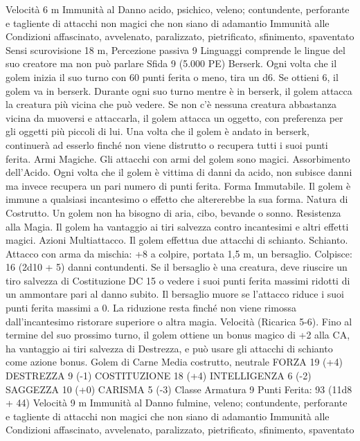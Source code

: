 \begin{multicols}{2}
Velocità 6 m
Immunità al Danno acido, psichico, veleno; contundente,
perforante e tagliente di attacchi non magici che non siano di
adamantio
Immunità alle Condizioni affascinato, avvelenato, paralizzato,
pietrificato, sfinimento, spaventato
Sensi scurovisione 18 m, Percezione passiva 9
Linguaggi comprende le lingue del suo creatore ma non può
parlare
Sfida 9 (5.000 PE)
Berserk. Ogni volta che il golem inizia il suo turno con 60 punti
ferita o meno, tira un d6. Se ottieni 6, il golem va in berserk.
Durante ogni suo turno mentre è in berserk, il golem attacca la
creatura più vicina che può vedere. Se non c’è nessuna creatura
abbastanza vicina da muoversi e attaccarla, il golem attacca un
oggetto, con preferenza per gli oggetti più piccoli di lui. Una
volta che il golem è andato in berserk, continuerà ad esserlo
finché non viene distrutto o recupera tutti i suoi punti ferita.
Armi Magiche. Gli attacchi con armi del golem sono magici.
Assorbimento dell’Acido. Ogni volta che il golem è vittima di
danni da acido, non subisce danni ma invece recupera un pari
numero di punti ferita.
Forma Immutabile. Il golem è immune a qualsiasi incantesimo o
effetto che altererebbe la sua forma.
Natura di Costrutto. Un golem non ha bisogno di aria, cibo,
bevande o sonno.
Resistenza alla Magia. Il golem ha vantaggio ai tiri salvezza
contro incantesimi e altri effetti magici.
Azioni
Multiattacco. Il golem effettua due attacchi di schianto.
Schianto. Attacco con arma da mischia: +8 a colpire, portata 1,5
m, un bersaglio.
Colpisce: 16 (2d10 + 5) danni contundenti. Se il bersaglio è una
creatura, deve riuscire un tiro salvezza di Costituzione DC 15 o
vedere i suoi punti ferita massimi ridotti di un ammontare pari al
danno subito. Il bersaglio muore se l’attacco riduce i suoi punti
ferita massimi a 0. La riduzione resta finché non viene rimossa
dall’incantesimo ristorare superiore o altra magia.
Velocità (Ricarica 5-6). Fino al termine del suo prossimo turno,
il golem ottiene un bonus magico di +2 alla CA, ha vantaggio ai
tiri salvezza di Destrezza, e può usare gli attacchi di schianto
come azione bonus.
Golem di Carne
Media costrutto, neutrale
FORZA 19 (+4)
DESTREZZA 9 (-1)
COSTITUZIONE 18 (+4)
INTELLIGENZA 6 (-2)
SAGGEZZA 10 (+0)
CARISMA 5 (-3)
Classe Armatura 9
\hspace*{0pt}\hfill{Punti Ferita}: 93 (11d8 + 44)
Velocità 9 m
Immunità al Danno fulmine, veleno; contundente, perforante e
tagliente di attacchi non magici che non siano di adamantio
Immunità alle Condizioni affascinato, avvelenato, paralizzato,
pietrificato, sfinimento, spaventato

\end{multicols}
